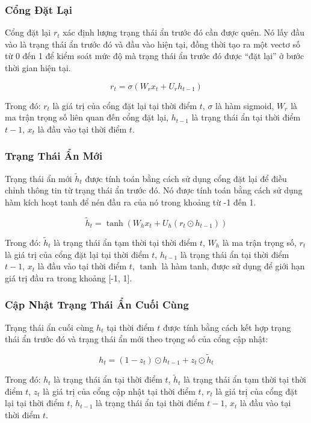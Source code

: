 \subsubsection{Cổng Đặt Lại}

Cổng đặt lại \( r_t \) xác định lượng trạng thái ẩn trước đó cần được quên. Nó lấy đầu vào là trạng thái ẩn trước đó và đầu vào hiện tại, đồng thời tạo ra một vectơ số từ 0 đến 1 để kiểm soát mức độ mà trạng thái ẩn trước đó được “đặt lại” ở bước thời gian hiện tại.

\[
r_t = \sigma(W_r x_t + U_r h_{t-1})
\]

Trong đó: \( r_t \) là giá trị của cổng đặt lại tại thời điểm \( t \), \( \sigma \) là hàm sigmoid, \( W_r \) là ma trận trọng số liên quan đến cổng đặt lại, \( h_{t-1} \) là trạng thái ẩn tại thời điểm \( t-1 \), \( x_t \) là đầu vào tại thời điểm \( t \).

\subsubsection{Trạng Thái Ẩn Mới}

Trạng thái ẩn mới \( \tilde{h}_t \) được tính toán bằng cách sử dụng cổng đặt lại để điều chỉnh thông tin từ trạng thái ẩn trước đó. Nó được tính toán bằng cách sử dụng hàm kích hoạt tanh để nén đầu ra của nó trong khoảng từ -1 đến 1.

\[
\tilde{h}_t = \tanh(W_h x_t + U_h (r_t \odot h_{t-1}))
\]

Trong đó: \( \tilde{h}_t \) là trạng thái ẩn tạm thời tại thời điểm \( t \), \( W_h \) là ma trận trọng số, \( r_t \) là giá trị của cổng đặt lại tại thời điểm \( t \), \( h_{t-1} \) là trạng thái ẩn tại thời điểm \( t-1 \), \( x_t \) là đầu vào tại thời điểm \( t \), \( \tanh \) là hàm tanh, được sử dụng để giới hạn giá trị đầu ra trong khoảng [-1, 1].

\subsubsection{Cập Nhật Trạng Thái Ẩn Cuối Cùng}

Trạng thái ẩn cuối cùng \( h_t \) tại thời điểm \( t \) được tính bằng cách kết hợp trạng thái ẩn trước đó và trạng thái ẩn mới theo trọng số của cổng cập nhật:

\[
h_t = (1 - z_t) \odot h_{t-1} + z_t \odot \tilde{h}_t
\]

Trong đó: \( h_t \) là trạng thái ẩn tại thời điểm \( t \), \( \tilde{h}_t \) là trạng thái ẩn tạm thời tại thời điểm \( t \), \( z_t \) là giá trị của cổng cập nhật tại thời điểm \( t \), \( r_t \) là giá trị của cổng đặt lại tại thời điểm \( t \), \( h_{t-1} \) là trạng thái ẩn tại thời điểm \( t-1 \), \( x_t \) là đầu vào tại thời điểm \( t \).

